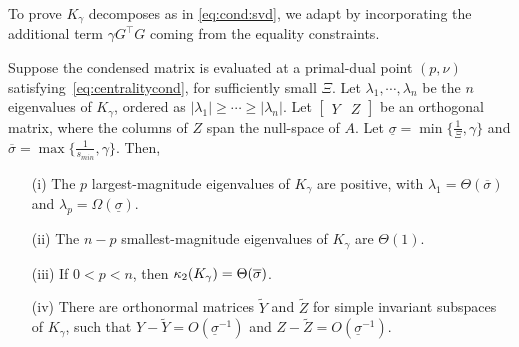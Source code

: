 To prove $K_\gamma$ decomposes as in \eqref{eq:cond:svd},
we adapt \cite[Theorem 3.2]{wright1998ill} by incorporating
the additional term $\gamma G^\top G$ coming from the equality constraints.
\begin{theorem}
  \label{thm:cond}
  Suppose the condensed matrix is evaluated at a primal-dual
  point $(p, \nu)$ satisfying~\eqref{eq:centralitycond},
  for sufficiently small $\Xi$.
  Let $\lambda_1, \cdots, \lambda_n$ be the $n$ eigenvalues of
  $K_\gamma$, ordered as $|\lambda_1| \geq  \cdots \geq |\lambda_n|$.
  Let $\begin{bmatrix} Y & Z \end{bmatrix}$ be an orthogonal
  matrix, where the columns of $Z$ span the null-space of
  $A$. Let $\underline{\sigma} =\min\{\frac{1}{\Xi}, \gamma\}$
  and $\overline{\sigma} = \max\{\frac{1}{s_{min}}, \gamma\}$.
  Then,
  \begin{enumerate}
    \item[(i)] The $p$ largest-magnitude eigenvalues of $K_\gamma$ are positive,
      with $\lambda_1 = \Theta(\overline{\sigma})$ and $\lambda_p = \Omega(\underline{\sigma})$.
    \item[(ii)] The $n-p$ smallest-magnitude eigenvalues of $K_\gamma$
      are $\Theta(1)$.
    \item[(iii)] If $0 < p < n$, then $\kappa_2(K_\gamma) = \Theta(\overline{\sigma})$.
    \item[(iv)] There are orthonormal matrices $\widetilde{Y}$ and $\widetilde{Z}$ for
      simple invariant subspaces of $K_\gamma$, such that $Y - \widetilde{Y} = O(\underline{\sigma}^{-1})$
      and $Z - \widetilde{Z} = O(\underline{\sigma}^{-1})$.
  \end{enumerate}
\end{theorem}
